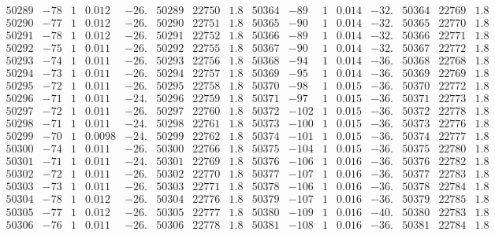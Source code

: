 \documentclass[11pt,reqno,a4letter]{article}
\numberwithin{figure}{section}
\numberwithin{table}{section}
\theoremstyle{plain}
\numberwithin{theorem}{section}
\theoremstyle{definition}
\begin{document}
\begin{table}[ht]
\begin{equation*}
{\begin{array}{ccccc|ccc||ccccc|ccc}
50289 & -78 & 1 & 0.012 & -26. & 50289 & 22750 & 1.8 & 50364 & -89 & 1 & 0.014 & -32. & 50364 & 22769 & 1.8  \\
50290 & -77 & 1 & 0.012 & -26. & 50290 & 22751 & 1.8 & 50365 & -90 & 1 & 0.014 & -32. & 50365 & 22770 & 1.8  \\
50291 & -78 & 1 & 0.012 & -26. & 50291 & 22752 & 1.8 & 50366 & -89 & 1 & 0.014 & -32. & 50366 & 22771 & 1.8  \\
50292 & -75 & 1 & 0.011 & -26. & 50292 & 22755 & 1.8 & 50367 & -90 & 1 & 0.014 & -32. & 50367 & 22772 & 1.8  \\
50293 & -74 & 1 & 0.011 & -26. & 50293 & 22756 & 1.8 & 50368 & -94 & 1 & 0.014 & -36. & 50368 & 22768 & 1.8  \\
50294 & -73 & 1 & 0.011 & -26. & 50294 & 22757 & 1.8 & 50369 & -95 & 1 & 0.014 & -36. & 50369 & 22769 & 1.8  \\
50295 & -72 & 1 & 0.011 & -26. & 50295 & 22758 & 1.8 & 50370 & -98 & 1 & 0.015 & -36. & 50370 & 22772 & 1.8  \\
50296 & -71 & 1 & 0.011 & -24. & 50296 & 22759 & 1.8 & 50371 & -97 & 1 & 0.015 & -36. & 50371 & 22773 & 1.8  \\
50297 & -72 & 1 & 0.011 & -26. & 50297 & 22760 & 1.8 & 50372 & -102 & 1 & 0.015 & -36. & 50372 & 22778 & 1.8  \\
50298 & -71 & 1 & 0.011 & -24. & 50298 & 22761 & 1.8 & 50373 & -100 & 1 & 0.015 & -36. & 50373 & 22776 & 1.8  \\
50299 & -70 & 1 & 0.0098 & -24. & 50299 & 22762 & 1.8 & 50374 & -101 & 1 & 0.015 & -36. & 50374 & 22777 & 1.8  \\
50300 & -74 & 1 & 0.011 & -26. & 50300 & 22766 & 1.8 & 50375 & -104 & 1 & 0.015 & -36. & 50375 & 22780 & 1.8  \\
50301 & -71 & 1 & 0.011 & -24. & 50301 & 22769 & 1.8 & 50376 & -106 & 1 & 0.016 & -36. & 50376 & 22782 & 1.8  \\
50302 & -72 & 1 & 0.011 & -26. & 50302 & 22770 & 1.8 & 50377 & -107 & 1 & 0.016 & -36. & 50377 & 22783 & 1.8  \\
50303 & -73 & 1 & 0.011 & -26. & 50303 & 22771 & 1.8 & 50378 & -106 & 1 & 0.016 & -36. & 50378 & 22784 & 1.8  \\
50304 & -78 & 1 & 0.012 & -26. & 50304 & 22776 & 1.8 & 50379 & -107 & 1 & 0.016 & -36. & 50379 & 22785 & 1.8  \\
50305 & -77 & 1 & 0.012 & -26. & 50305 & 22777 & 1.8 & 50380 & -109 & 1 & 0.016 & -40. & 50380 & 22783 & 1.8  \\
50306 & -76 & 1 & 0.011 & -26. & 50306 & 22778 & 1.8 & 50381 & -108 & 1 & 0.016 & -36. & 50381 & 22784 & 1.8  \\

\end{array}}
\end{equation*}
\end{table}
\end{document}
